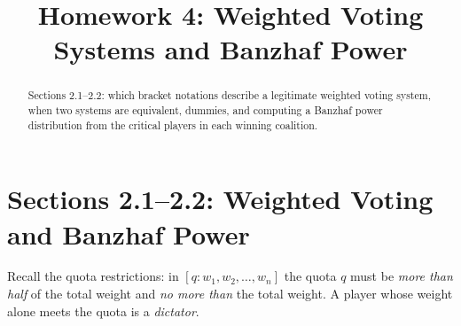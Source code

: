 \documentclass[12pt]{ximera}
\title{Homework 4: Weighted Voting Systems and Banzhaf Power}
\begin{document}
\begin{abstract}
Sections 2.1--2.2: which bracket notations describe a legitimate weighted voting
system, when two systems are equivalent, dummies, and computing a Banzhaf power
distribution from the critical players in each winning coalition.
\end{abstract}
\maketitle

\section*{Sections 2.1--2.2: Weighted Voting and Banzhaf Power}

Recall the quota restrictions: in $[q: w_1, w_2, \ldots, w_n]$ the quota $q$ must be
\emph{more than half} of the total weight and \emph{no more than} the total weight. A
player whose weight alone meets the quota is a \emph{dictator}.
\end{document}
